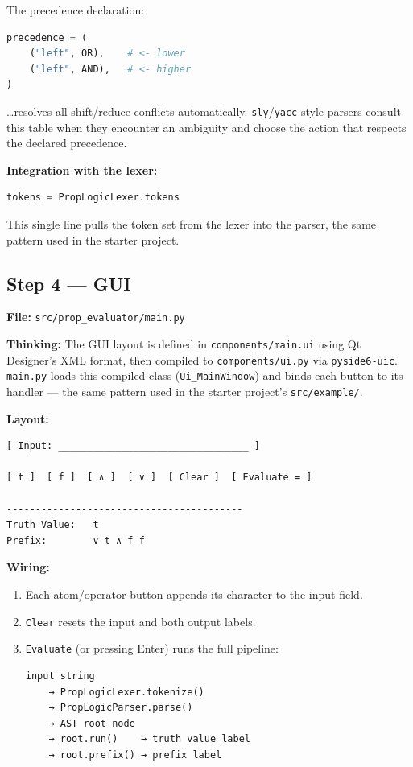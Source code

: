\documentclass[12pt,a4paper]{article}
\begin{document}
The precedence declaration:

\begin{lstlisting}[language=Python]
precedence = (
    ("left", OR),    # <- lower
    ("left", AND),   # <- higher
)
\end{lstlisting}

\ldots resolves all shift/reduce conflicts automatically. \texttt{sly}/\texttt{yacc}-style parsers
consult this table when they encounter an ambiguity and choose the action that
respects the declared precedence.

\textbf{Integration with the lexer:}

\begin{lstlisting}[language=Python]
tokens = PropLogicLexer.tokens
\end{lstlisting}

This single line pulls the token set from the lexer into the parser, the same
pattern used in the starter project.


\subsection{Step 4 --- GUI}

\textbf{File:} \texttt{src/prop\_evaluator/main.py}

\textbf{Thinking:} The GUI layout is defined in \texttt{components/main.ui} using Qt
Designer's XML format, then compiled to \texttt{components/ui.py} via \texttt{pyside6-uic}.
\texttt{main.py} loads this compiled class (\texttt{Ui\_MainWindow}) and binds each button to
its handler --- the same pattern used in the starter project's \texttt{src/example/}.

\textbf{Layout:}

\begin{lstlisting}
[ Input: _________________________________ ]

[ t ]  [ f ]  [ ∧ ]  [ ∨ ]  [ Clear ]  [ Evaluate = ]

-----------------------------------------
Truth Value:   t
Prefix:        ∨ t ∧ f f
\end{lstlisting}

\textbf{Wiring:}

\begin{enumerate}
    \item Each atom/operator button appends its character to the input field.
    \item \texttt{Clear} resets the input and both output labels.
    \item \texttt{Evaluate} (or pressing Enter) runs the full pipeline:
    \begin{lstlisting}
input string
    → PropLogicLexer.tokenize()
    → PropLogicParser.parse()
    → AST root node
    → root.run()    → truth value label
    → root.prefix() → prefix label
    \end{lstlisting}
\end{enumerate}
\end{document}
